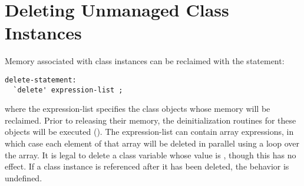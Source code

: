 \section{Deleting Unmanaged Class Instances}
\label{Class_Delete}

Memory associated with  class instances can be reclaimed
with the  statement:

\begin{syntax}
\begin{verbatim}
delete-statement:
  `delete' expression-list ;
\end{verbatim}
\end{syntax}

where the expression-list specifies the class objects whose memory
will be reclaimed.  Prior to releasing their memory, the
deinitialization routines for these objects will be executed
().  The expression-list can contain array
expressions, in which case each element of that array will be deleted
in parallel using a  loop over the array.  It is legal to
delete a class variable whose value is , though this has no
effect.  If a class instance is referenced after it has been deleted,
the behavior is undefined.

